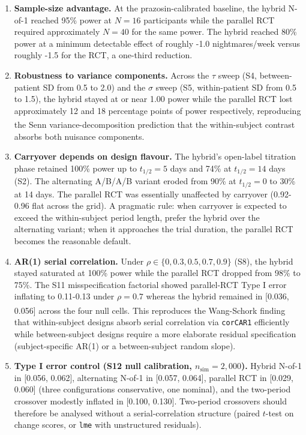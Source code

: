 \documentclass[
  11pt,
]{article}
\begin{document}
\begin{enumerate}
\def\labelenumi{\arabic{enumi}.}
\item
  \textbf{Sample-size advantage.} At the prazosin-calibrated baseline,
  the hybrid N-of-1 reached 95\% power at \(N = 16\) participants while
  the parallel RCT required approximately \(N = 40\) for the same power.
  The hybrid reached 80\% power at a minimum detectable effect of
  roughly -1.0 nightmares/week versus roughly -1.5 for the RCT, a
  one-third reduction.
\item
  \textbf{Robustness to variance components.} Across the \(\tau\) sweep
  (S4, between-patient SD from 0.5 to 2.0) and the \(\sigma\) sweep (S5,
  within-patient SD from 0.5 to 1.5), the hybrid stayed at or near 1.00
  power while the parallel RCT lost approximately 12 and 18 percentage
  points of power respectively, reproducing the
  Senn\textsuperscript{}
  variance-decomposition prediction that the within-subject contrast
  absorbs both nuisance components.
\item
  \textbf{Carryover depends on design flavour.} The hybrid's open-label
  titration phase retained 100\% power up to \(t_{1/2} = 5\) days and
  74\% at \(t_{1/2} = 14\) days (S2). The alternating A/B/A/B variant
  eroded from 90\% at \(t_{1/2} = 0\) to 30\% at 14 days. The parallel
  RCT was essentially unaffected by carryover (0.92-0.96 flat across the
  grid). A pragmatic rule: when carryover is expected to exceed the
  within-subject period length, prefer the hybrid over the alternating
  variant; when it approaches the trial duration, the parallel RCT
  becomes the reasonable default.
\item
  \textbf{AR(1) serial correlation.} Under
  \(\rho \in \{0, 0.3, 0.5, 0.7, 0.9\}\) (S8), the hybrid stayed
  saturated at 100\% power while the parallel RCT dropped from 98\% to
  75\%. The S11 misspecification factorial showed parallel-RCT Type I
  error inflating to 0.11-0.13 under \(\rho = 0.7\) whereas the hybrid
  remained in {[}0.036, 0.056{]} across the four null cells. This
  reproduces the
  Wang-Schork\textsuperscript{}
  finding that within-subject designs absorb serial correlation via
  \texttt{corCAR1} efficiently while between-subject designs require a
  more elaborate residual specification (subject-specific AR(1) or a
  between-subject random slope).
\item
  \textbf{Type I error control (S12 null calibration,
  \(n_{\text{sim}} = 2{,}000\)).} Hybrid N-of-1 in {[}0.056, 0.062{]},
  alternating N-of-1 in {[}0.057, 0.064{]}, parallel RCT in {[}0.029,
  0.060{]} (three configurations conservative, one nominal), and the
  two-period crossover modestly inflated in {[}0.100, 0.130{]}.
  Two-period crossovers should therefore be analysed without a
  serial-correlation structure (paired \(t\)-test on change scores, or
  \texttt{lme} with unstructured residuals).
\end{enumerate}
\end{document}
